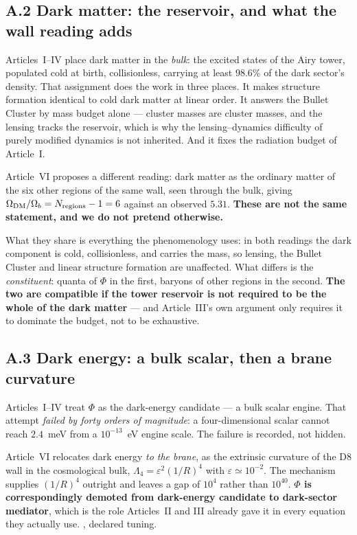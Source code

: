 \subsection*{A.2 Dark matter: the reservoir, and what the wall reading adds}
Articles~I--IV place dark matter in the \emph{bulk}: the excited states of the Airy
tower, populated cold at birth, collisionless, carrying at least $98.6\%$ of the dark
sector's density. That assignment does the work in three places. It makes structure
formation identical to cold dark matter at linear order. It answers the Bullet Cluster
by mass budget alone --- cluster masses are cluster masses, and the lensing tracks the
reservoir, which is why the lensing--dynamics difficulty of purely modified dynamics is
not inherited. And it fixes the radiation budget of Article~I.

Article~VI proposes a different reading: dark matter as the ordinary matter of the six
other regions of the same wall, seen through the bulk, giving
$\Omega_{\rm DM}/\Omega_b=N_{\rm regions}-1=6$ against an observed $5.31$.
\textbf{These are not the same statement, and we do not pretend otherwise.}

What they share is everything the phenomenology uses: in both readings the dark
component is cold, collisionless, and carries the mass, so lensing, the Bullet Cluster
and linear structure formation are unaffected. What differs is the \emph{constituent}:
quanta of $\Phi$ in the first, baryons of other regions in the second.
\textbf{The two are compatible if the tower reservoir is not required to be the whole
of the dark matter} --- and Article~III's own argument only requires it to dominate the
budget, not to be exhaustive. \Open

\subsection*{A.3 Dark energy: a bulk scalar, then a brane curvature}
Articles~I--IV treat $\Phi$ as the dark-energy candidate --- a bulk scalar engine. That
attempt \emph{failed by forty orders of magnitude}: a four-dimensional scalar cannot
reach $2.4$~meV from a $10^{-13}$~eV engine scale. The failure is recorded, not hidden.

Article~VI relocates dark energy \emph{to the brane}, as the extrinsic curvature of the
D8 wall in the cosmological bulk, $\Lambda_4=\varepsilon^2(1/R)^4$ with
$\varepsilon\simeq10^{-2}$. The mechanism supplies $(1/R)^4$ outright and leaves a gap
of $10^4$ rather than $10^{40}$. \textbf{$\Phi$ is correspondingly demoted from
dark-energy candidate to dark-sector mediator}, which is the role Articles~II and III
already gave it in every equation they actually use. \Candidate, declared tuning.

